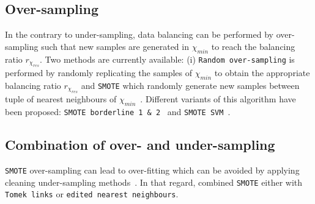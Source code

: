 \documentclass[twoside,11pt]{article}
\begin{document}

\subsection{Over-sampling}

In the contrary to under-sampling, data balancing can be performed by over-sampling such that new samples are generated in $\chi_{min}$ to reach the balancing ratio $r_{\chi_{res}}$.
Two methods are currently available: (i) \texttt{Random over-sampling} is performed by randomly replicating the samples of $\chi_{min}$ to obtain the appropriate balancing ratio $r_{\chi_{res}}$ and \texttt{SMOTE} which randomly generate new samples between tuple of nearest neighbours of $\chi_{min}$~\citep{chawla2002smote}.
Different variants of this algorithm have been proposed: \texttt{SMOTE borderline 1 \& 2}~\citep{han2005borderline} and \texttt{SMOTE SVM}~\citep{nguyen2011borderline}.



\subsection{Combination of over- and under-sampling}

\texttt{SMOTE} over-sampling can lead to over-fitting which can be avoided by applying cleaning under-sampling methods~\citep{prati2009data}.
In that regard, \cite{batista2003balancing} combined \texttt{SMOTE} either with \texttt{Tomek links} or \texttt{edited nearest neighbours}.
\end{document}
